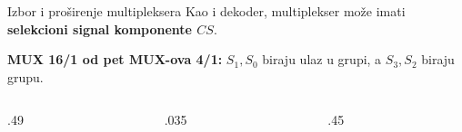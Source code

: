 \begin{frame}[t,label=03-s015]{Izbor i proširenje multipleksera}
\setlength{\parskip}{0pt}
\fontsize{10}{12}\selectfont
Kao i dekoder, multiplekser može imati \textbf{selekcioni signal komponente \(CS\)}.
\par
\textbf{MUX 16/1 od pet MUX-ova 4/1:} \(S_1,S_0\) biraju ulaz u grupi, a \(S_3,S_2\) biraju grupu.
\par\vspace{.5mm}
\begingroup
\def\DEoznsize{9}\def\DEoblik{.52}\def\DEvisina{.52cm}\def\DEdekmod{1}\def\DEcs{1}\def\DEprimer{0}\def\DEjedinica{.60cm}
\begin{columns}[c,onlytextwidth]
\begin{column}{.49\textwidth}\centering
\begin{minipage}[c]{.66\linewidth}\centering

\end{minipage}\hfill
\begin{minipage}[c]{.32\linewidth}\centering
\def\DEmuxX{.88cm}\def\DEmuxY{.88cm}\def\DEmuxFont{9}

\end{minipage}
\end{column}
\begin{column}{.035\textwidth}\centering
{}
\end{column}
\begin{column}{.45\textwidth}\centering

\end{column}
\end{columns}
\endgroup
\end{frame}
